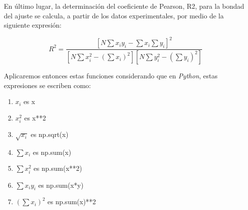 \documentclass[twoside]{article}
\def\d{\displaystyle}
\begin{document}
En último lugar, la determinación del coeficiente de Pearson, R2, para la bondad del ajuste se calcula, a partir de los datos experimentales, por medio de la siguiente expresión:

\begin{equation}
R^2 = \d\frac{[N\sum x_i y_i - \sum x_i \sum y_i]^2}{[N \sum x_i^2 - (\sum x_i)^2][N \sum y_i^2 - (\sum y_i)^2]}
\end{equation}

Aplicaremos entonces estas funciones considerando que en \textit{Python}, estas expresiones se escriben como:

\begin{enumerate}
\item $x_i$ es x
\item $x_i^2$ es x**2
\item $\sqrt{x_i}$ es np.sqrt(x)
\item $\sum x_i$ es np.sum(x)
\item $\sum x_i^2$ es np.sum(x**2)
\item $\sum x_i y_i$ es np.sum(x*y)
\item $(\sum x_i)^2$ es np.sum(x)**2
\end{enumerate}
\end{document}
